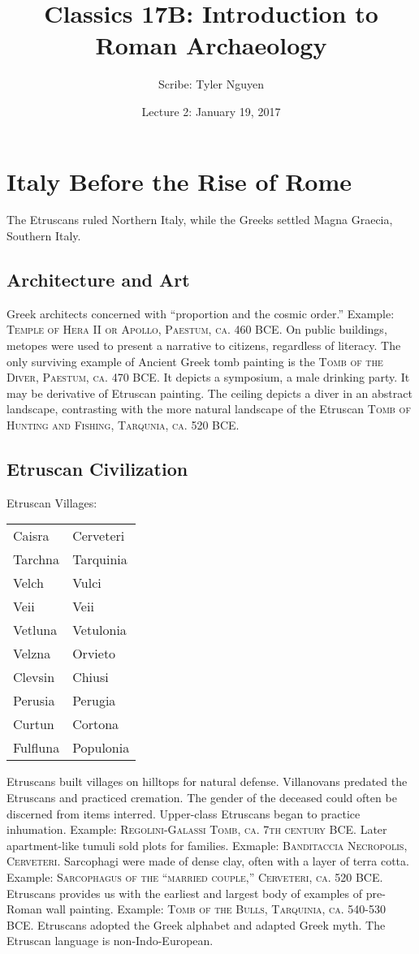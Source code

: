 \documentclass{article}
\begin{document}
\title{Classics 17B: Introduction to Roman Archaeology}
\author{Scribe: Tyler Nguyen}
\date{Lecture 2: January 19, 2017}
\maketitle
\section{Italy Before the Rise of Rome}
The Etruscans ruled Northern Italy, while the Greeks settled Magna Graecia, Southern Italy.
\subsection{Architecture and Art}
Greek architects concerned with ``proportion and the cosmic order.'' Example: \textsc{Temple of Hera II or Apollo, Paestum, ca. 460 BCE}.  On public buildings, metopes were used to present a narrative to citizens, regardless of literacy. The only surviving example of Ancient Greek tomb painting is the \textsc{Tomb of the Diver, Paestum, ca. 470 BCE}.  It depicts a symposium, a male drinking party. It may be derivative of Etruscan painting.  The ceiling depicts a diver in an abstract landscape, contrasting with the more natural landscape of the Etruscan \textsc{Tomb of Hunting and Fishing, Tarqunia, ca. 520 BCE}.
\subsection{Etruscan Civilization}
Etruscan Villages:\\
\begin{tabular}{ll}
Caisra & Cerveteri\\
Tarchna & Tarquinia\\
Velch & Vulci\\
Veii & Veii\\
Vetluna & Vetulonia\\
Velzna & Orvieto\\
Clevsin & Chiusi\\
Perusia & Perugia\\
Curtun & Cortona\\
Fulfluna & Populonia\\
\end{tabular}

Etruscans built villages on hilltops for natural defense. Villanovans predated the Etruscans and practiced cremation. The gender of the deceased could often be discerned from items interred. Upper-class Etruscans began to practice inhumation. Example: \textsc{Regolini-Galassi Tomb, ca. 7th century BCE}. Later apartment-like tumuli sold plots for families. Exmaple: \textsc{Banditaccia Necropolis, Cerveteri}. Sarcophagi were made of dense clay, often with a layer of terra cotta. Example: \textsc{Sarcophagus of the ``married couple,'' Cerveteri, ca. 520 BCE}.  Etruscans provides us with the earliest and largest body of examples of pre-Roman wall painting. Example: \textsc{Tomb of the Bulls, Tarquinia, ca. 540-530 BCE}. Etruscans adopted the Greek alphabet and adapted Greek myth.  The Etruscan language is non-Indo-European.
\end{document}
